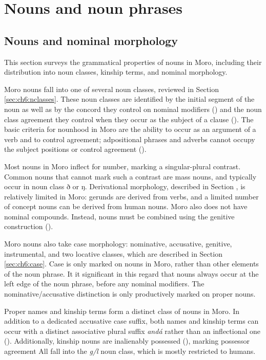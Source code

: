 \part{Nouns and noun phrases}

\chapter{Nouns and nominal morphology}\label{chapter:nouns}

This section surveys the grammatical properties of nouns in Moro, including their distribution into noun classes, kinship terms, and nominal morphology. 

Moro nouns fall into one of several noun classes, reviewed in Section \ref{sec:ch6:nclasses}. These noun classes are identified by the initial segment of the noun as well as by the concord they control on nominal modifiers () and the noun class agreement they control when they occur as the subject of a clause (). The basic criteria for nounhood in Moro are the ability to occur as an argument of a verb and to control agreement; adpositional phrases and adverbs cannot occupy the subject positions or control agreement ().

Most nouns in Moro inflect for number, marking a singular-plural contrast. Common nouns that cannot mark such a contrast are mass nouns, and typically occur in noun class ð or ŋ. Derivational morphology, described in Section , is relatively limited in Moro: gerunds are derived from verbs, and a limited number of concept nouns can be derived from human nouns. Moro also does not have nominal compounds. Instead, nouns must be combined using the genitive construction ().

Moro nouns also take case morphology: nominative, accusative, genitive, instrumental, and two locative classes, which are described in Section \ref{sec:ch6:case}. Case is only marked on nouns in Moro, rather than other elements of the noun phrase. It it significant in this regard that nouns always occur at the left edge of the noun phrase, before any nominal modifiers. The nominative/accusative distinction is only productively marked on proper nouns.

Proper names and kinship terms form a distinct class of nouns in Moro. In addition to a dedicated accusative case suffix, both names and kinship terms can occur with a distinct associative plural suffix \textit{andá} rather than an inflectional one (). Additionally, kinship nouns are inalienably possessed (), marking possessor agreement All fall into the \textit{g/l} noun class, which is mostly restricted to humans.

